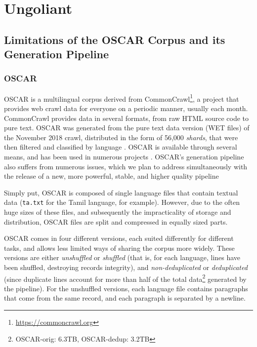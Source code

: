 \chapter{Ungoliant}


\section{Limitations of the OSCAR Corpus and its Generation Pipeline}

\subsection{OSCAR}

OSCAR is a multilingual corpus derived from CommonCrawl\footnote{\url{https://commoncrawl.org}}, a project that provides web crawl data for everyone on a periodic manner, usually each month. CommonCrawl provides data in several formats, from raw HTML source code to pure text. OSCAR was generated from the pure text data version (WET files) of the November 2018 crawl, distributed in the form of 56,000 \emph{shards}, that were then filtered and classified by language \citep{ortiz-suarez-etal-2019-asynchronous,ortiz-suarez-etal-2020-monolingual}. OSCAR is available through several means, and has been used in numerous projects \citep{ortiz-suarez-etal-2019-asynchronous}. OSCAR's generation pipeline also suffers from numerous issues, which we plan to address simultaneously with the release of a new, more powerful, stable, and higher quality pipeline

Simply put, OSCAR is composed of single language files that contain textual data (\texttt{ta.txt} for the Tamil language, for example). However, due to the often huge sizes of these files, and subsequently the impracticality of storage and distribution, OSCAR files are split and compressed in equally sized parts.

OSCAR comes in four different versions, each suited differently for different tasks, and allows less limited ways of sharing the corpus more widely. These versions are either \emph{unshuffled} or \emph{shuffled} (that is, for each language, lines have been shuffled, destroying records integrity), and \emph{non-deduplicated} or \emph{deduplicated} (since duplicate lines account for more than half of the total data\footnote{OSCAR-orig: 6.3TB, OSCAR-dedup: 3.2TB} generated by the pipeline).
For the unshuffled versions, each language file contains paragraphs that come from the same record, and each paragraph is separated by a newline.

